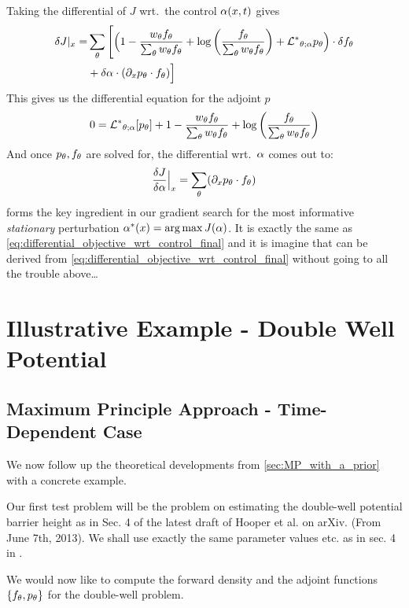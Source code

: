 Taking the differential of $J$ wrt.\ the control $\alpha(x,t)$ gives
\begin{align*}
\delta J|_{x} =&
\sum_{ \theta} \Bigg[\Big(
1 - \frac{  w_{ \theta} { f_{ \theta}} }{\sum_{ \theta} w_{ \theta}{ f_{ \theta}}} 
+ \log\left(\frac{f_{ \theta}} {\sum_{ \theta} { w_{ \theta} } { f_{ \theta}} }\right)   
+  { { \mathcal{L} }^* }_{{ \theta};\alpha} p_{ \theta}
\Big)  \cdot { \delta f_{ \theta}} 
\\
&+ \delta \alpha \cdot ({\partial}_x { p_{ \theta}} \cdot { f_{ \theta}})
\Big]
\end{align*}
This gives us the differential equation for the adjoint $p$
\begin{equation}
0 = 
{ { \mathcal{L} }^* }_{{ \theta};\alpha} [p_{ \theta}] +  
1 - \frac{  w_{ \theta} { f_{ \theta}} }{\sum_{ \theta} w_{ \theta}{ f_{ \theta}}} 
+ \log\left(\frac{f_{ \theta}} {\sum_{ \theta} { w_{ \theta} } { f_{ \theta}} }\right)   
\end{equation}
And once ${ p_{ \theta}}, { f_{ \theta}}$ are solved for, the differential wrt.\ $\alpha$ comes
out to:
\begin{equation}
\frac {\delta J}{\delta \alpha} \Big|_{x} = \sum_{ \theta} ({\partial}_x { p_{ \theta}} \cdot { f_{ \theta}})
\label{eq:differential_objective_stationary_wrt_control_final}
\end{equation}
 forms the key ingredient
in our gradient search for the most informative {\sl stationary} perturbation
$\a^*(x) = \argmax J(\a)$. It is exactly the same as
\cref{eq:differential_objective_wrt_control_final} and it is imagine that
 can be derived
from \cref{eq:differential_objective_wrt_control_final} without going to all
the trouble above\ldots
 

\section{Illustrative Example - Double Well Potential}
\subsection{Maximum Principle Approach - Time-Dependent Case}
\label{sec:MP_Doublewell_TimeDependent}
We now follow up the theoretical developments from \cref{sec:MP_with_a_prior}
with a concrete example.

Our first test problem will be the problem on estimating the double-well
potential barrier height as in Sec. 4 of the latest draft of Hooper et al.
\cite{Lin} on arXiv. (From June 7th, 2013). We shall use exactly the same parameter values
etc. as in sec. 4 in \cite{Lin}.

We would now like to compute the forward density and the adjoint functions
$\{{ f_{ \theta}}, { p_{ \theta}}\}$ for the double-well problem.

